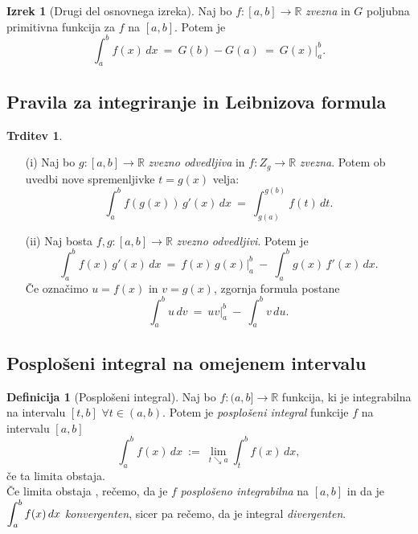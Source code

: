 \documentclass[11pt]{article}
\theoremstyle{definition}
\newtheorem{definicija}{Definicija}[section]
\theoremstyle{definition}
\newtheorem{trditev}{Trditev}[section]
\theoremstyle{definition}
\newtheorem{izrek}{Izrek}[section]
\theoremstyle{theorem}
\begin{document}
\begin{izrek}[Drugi del osnovnega izreka]

Naj bo $f:[a, b] \rightarrow \mathbb{R}$ \textit{zvezna} in $G$ poljubna primitivna funkcija za $f$ na $[a, b]$. Potem je
$$\int_a^b f(x)\,dx ~=~ G(b) - G(a) ~=~ G(x) \Big|_a^b.$$

\end{izrek}
\vspace{0.5cm}


\subsection{Pravila za integriranje in Leibnizova formula}
\vspace{0.5cm}

\begin{trditev}
~
\begin{enumerate}

	\item[(i)] Naj bo $g:[a, b] \rightarrow \mathbb{R}$ \textit{zvezno odvedljiva} in $f: Z_g \rightarrow \mathbb{R}$ \textit{zvezna}. Potem ob uvedbi nove spremenljivke $t = g(x)$ velja:
	$$\int_a^b f(g(x))\,g'(x)\,dx ~=~ \int_{g(a)}^{g(b)} f(t)\,dt.$$
	
	\item[(ii)] Naj bosta $f,g:[a, b] \rightarrow \mathbb{R}$ \textit{zvezno odvedljivi}. Potem je
	$$\int_a^b f(x)\,g'(x)\,dx ~=~ f(x)\,g(x) \Big|_a^b ~-~ \int_a^b g(x)\,f'(x)\,dx.$$
	Če označimo $u = f(x)$ in $v = g(x)$, zgornja formula postane
	$$\int_a^b u\,dv ~=~ uv \Big|_a^b ~-~ \int_a^b v\,du.$$
	
\end{enumerate}
\end{trditev}
\vspace{0.5cm}


\subsection{Posplošeni integral na omejenem intervalu}
\vspace{0.5cm}

\begin{definicija}[Posplošeni integral]

Naj bo $f:(a, b] \rightarrow \mathbb{R}$ funkcija, ki je integrabilna na intervalu $[t, b]$ $\forall t \in (a, b)$. Potem je \textit{posplošeni integral} funkcije $f$ na intervalu $[a, b]$
$$\int_{a}^{b} f(x)\,dx ~:=~ \lim_{t \searrow a} \int_{t}^{b} f(x)\,dx,$$
če ta limita obstaja. \\

\noindent Če limita obstaja , rečemo, da je $f$ \textit{posplošeno integrabilna} na $[a, b]$ in da je $\mathlarger{\int_{a}^{b} f(x)\,dx}$ \textit{konvergenten}, sicer pa rečemo, da je integral \textit{divergenten}.

\end{definicija}
\vspace{0.5cm}
\end{document}
